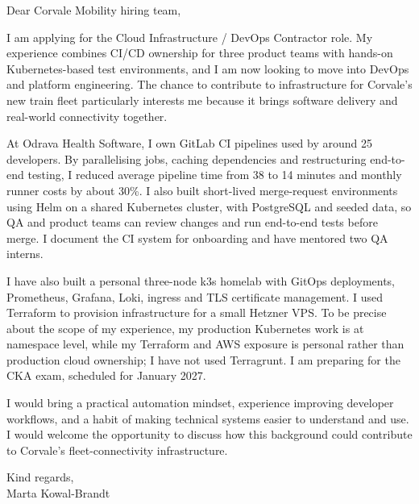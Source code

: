 \documentclass[11pt,a4paper]{article}
\begin{document}
Dear Corvale Mobility hiring team,

I am applying for the Cloud Infrastructure / DevOps Contractor role. My experience combines CI/CD ownership for three product teams with hands-on Kubernetes-based test environments, and I am now looking to move into DevOps and platform engineering. The chance to contribute to infrastructure for Corvale's new train fleet particularly interests me because it brings software delivery and real-world connectivity together.

At Odrava Health Software, I own GitLab CI pipelines used by around 25 developers. By parallelising jobs, caching dependencies and restructuring end-to-end testing, I reduced average pipeline time from 38 to 14 minutes and monthly runner costs by about 30\%. I also built short-lived merge-request environments using Helm on a shared Kubernetes cluster, with PostgreSQL and seeded data, so QA and product teams can review changes and run end-to-end tests before merge. I document the CI system for onboarding and have mentored two QA interns.

I have also built a personal three-node k3s homelab with GitOps deployments, Prometheus, Grafana, Loki, ingress and TLS certificate management. I used Terraform to provision infrastructure for a small Hetzner VPS. To be precise about the scope of my experience, my production Kubernetes work is at namespace level, while my Terraform and AWS exposure is personal rather than production cloud ownership; I have not used Terragrunt. I am preparing for the CKA exam, scheduled for January 2027.

I would bring a practical automation mindset, experience improving developer workflows, and a habit of making technical systems easier to understand and use. I would welcome the opportunity to discuss how this background could contribute to Corvale's fleet-connectivity infrastructure.

Kind regards,\\
Marta Kowal-Brandt
\end{document}
